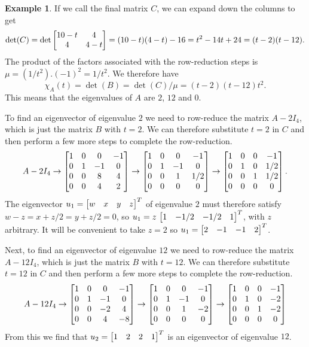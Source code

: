 \documentclass[reqno]{amsart}
\theoremstyle{definition}
\newtheorem{example}[theorem]{Example}
\begin{document}
\begin{example}
 If we call the final matrix $C$, we can expand down the columns to
 get  
 \[ \det(C) = \det\left[\begin{matrix} 10-t & 4 \\ 4 & 4-t \end{matrix}\right]
     = (10-t)(4-t)-16 = t^2-14t+24 = (t-2)(t-12).
 \]
 The product of the factors associated with the row-reduction steps is
 $\mu=(1/t^2).(-1)^2=1/t^2$.  We therefore have 
 \[ \chi_A(t)=\det(B)=\det(C)/\mu = (t-2)(t-12)t^2. \]
 This means that the eigenvalues of $A$ are $2$, $12$ and $0$.

 To find an eigenvector of eigenvalue $2$ we need to row-reduce the
 matrix $A-2I_4$, which is just the matrix $B$ with $t=2$.  We can
 therefore substitute $t=2$ in $C$ and then perform a few more steps
 to complete the row-reduction.
 \[ A-2I_4 \to
    \left[\begin{matrix} 1   & 0   & 0    & -1 \\
         0   & 1   & -1   & 0 \\
         0   & 0   & 8    & 4 \\
         0   & 0   & 4    & 2 \end{matrix}\right]         
    \to 
    \left[\begin{matrix} 1   & 0   & 0    & -1 \\
         0   & 1   & -1   & 0 \\
         0   & 0   & 1    & 1/2 \\
         0   & 0   & 0    & 0 \end{matrix}\right]         
    \to 
    \left[\begin{matrix} 1   & 0   & 0    & -1 \\
         0   & 1   & 0    & 1/2 \\
         0   & 0   & 1    & 1/2 \\
         0   & 0   & 0    & 0 \end{matrix}\right].         
 \]
 The eigenvector $u_1=\left[\begin{matrix} w&x&y&z\end{matrix}\right]^T$ of eigenvalue $2$ must
 therefore satisfy $w-z=x+z/2=y+z/2=0$, so
 $u_1=z\,\left[\begin{matrix} 1&-1/2&-1/2&1\end{matrix}\right]^T$, with $z$ arbitrary.  It will be
 convenient to take $z=2$ so $u_1=\left[\begin{matrix} 2&-1&-1&2\end{matrix}\right]^T$.

 Next, to find an eigenvector of eigenvalue $12$ we need to row-reduce the
 matrix $A-12I_4$, which is just the matrix $B$ with $t=12$.  We can
 therefore substitute $t=12$ in $C$ and then perform a few more steps
 to complete the row-reduction.
 \[ A-12I_4 \to 
    \left[\begin{matrix} 1   & 0   & 0    & -1 \\
         0   & 1   & -1   & 0 \\
         0   & 0   & -2   & 4 \\
         0   & 0   & 4    & -8 \end{matrix}\right]         
    \to
    \left[\begin{matrix} 1   & 0   & 0    & -1 \\
         0   & 1   & -1   & 0 \\
         0   & 0   & 1    & -2 \\
         0   & 0   & 0    & 0 \end{matrix}\right]         
    \to
    \left[\begin{matrix} 1   & 0   & 0    & -1 \\
         0   & 1   & 0    & -2 \\
         0   & 0   & 1    & -2 \\
         0   & 0   & 0    & 0 \end{matrix}\right]         
 \]
 From this we find that $u_2=\left[\begin{matrix} 1&2&2&1\end{matrix}\right]^T$ is an eigenvector of
 eigenvalue $12$.


\end{example}
\end{document}
